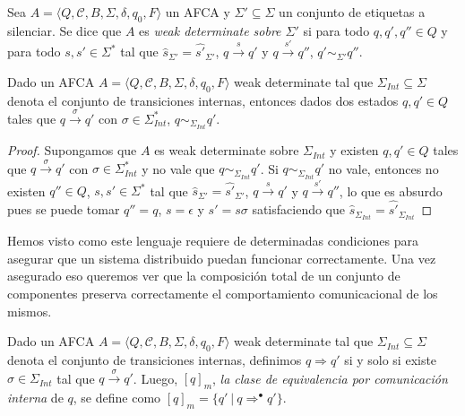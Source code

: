 \begin{definition}
Sea $A= \langle Q, \mathcal{C}, B, \Sigma, \delta, q_0, F \rangle$ un AFCA y $\Sigma' \subseteq \Sigma$ un conjunto de etiquetas a silenciar. Se dice que $A$ es \emph{weak determinate sobre $\Sigma'$} si para todo $q, q', q'' \in Q$ y para todo $s, s' \in \Sigma^*$ tal que $\widehat{s}_{\Sigma'} = \widehat{s'}_{\Sigma'}$, $q \xrightarrow{s} q'$ y $q \xrightarrow{s'} q''$, $q' \sim_{\Sigma'} q''$.
\end{definition}

\begin{prop}
Dado un AFCA $A = \langle Q, \mathcal{C}, B, \Sigma, \delta, q_0, F \rangle$ weak determinate tal que $\Sigma_\mathit{Int} \subseteq \Sigma$ denota el conjunto de transiciones internas, entonces dados dos estados $q, q' \in Q$ tales que $q \xrightarrow{\sigma} q'$ con $\sigma \in \Sigma_{\mathit{Int}}^*$,  $q \sim_{\Sigma_\mathit{Int}} q'$.
\end{prop}
\begin{proof}
Supongamos que $A$ es weak determinate sobre $\Sigma_\mathit{Int}$ y existen $q, q' \in Q$ tales que $q \xrightarrow{\sigma} q'$ con $\sigma \in \Sigma_{\mathit{Int}}^*$ y no vale que $q \sim_{\Sigma_\mathit{Int}} q'$. Si $q \sim_{\Sigma_\mathit{Int}} q'$ no vale, entonces no existen $q'' \in Q$,  $s, s' \in \Sigma^*$ tal que $\widehat{s}_{\Sigma'} = \widehat{s'}_{\Sigma'}$, $q \xrightarrow{s} q'$ y $q \xrightarrow{s'} q''$, lo que es absurdo pues se puede tomar $q'' = q$, $s = \epsilon$ y $s' = s\sigma$ satisfaciendo que $\widehat{s}_{\Sigma_\mathit{Int}} = \widehat{s'}_{\Sigma_\mathit{Int}}$
\end{proof}

Hemos visto como este lenguaje requiere de determinadas condiciones para asegurar que un sistema distribuido puedan funcionar correctamente. Una vez asegurado eso queremos ver que la composición total de un conjunto de componentes preserva correctamente el comportamiento comunicacional de los mismos.

\begin{definition} \label{def:eci}
Dado un AFCA $A = \langle Q, \mathcal{C}, B, \Sigma, \delta, q_0, F \rangle$ weak determinate tal que $\Sigma_\mathit{Int} \subseteq \Sigma$ denota el conjunto de transiciones internas, definimos $q \Rightarrow q'$ si y solo si existe $\sigma \in \Sigma_\mathit{Int}$ tal que $q \xrightarrow{\sigma} q'$. Luego, $[q]_m$, \emph{la clase de equivalencia por comunicación interna} de $q$, se define como $[q]_m = \{q'\ |\ q \Rightarrow^\bullet q'\}$. 
\end{definition}

